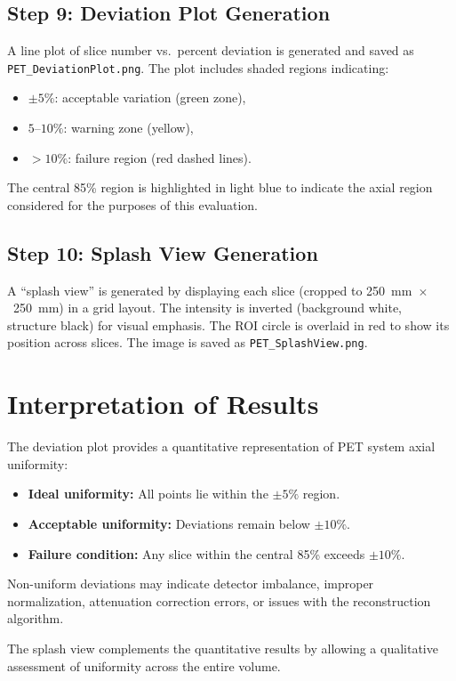 \documentclass[12pt]{article}
\begin{document}
\subsection{Step 9: Deviation Plot Generation}
A line plot of slice number vs.\ percent deviation is generated and saved as \texttt{PET\_DeviationPlot.png}. The plot includes shaded regions indicating:
\begin{itemize}
    \item $\pm5\%$: acceptable variation (green zone),
    \item $5\text{–}10\%$: warning zone (yellow),
    \item $>10\%$: failure region (red dashed lines).
\end{itemize}
The central 85\% region is highlighted in light blue to indicate the axial region considered for the purposes of this evaluation.

\subsection{Step 10: Splash View Generation}
A “splash view” is generated by displaying each slice (cropped to 250~mm~$\times$~250~mm) in a grid layout. The intensity is inverted (background white, structure black) for visual emphasis. The ROI circle is overlaid in red to show its position across slices. The image is saved as \texttt{PET\_SplashView.png}.

\section{Interpretation of Results}
The deviation plot provides a quantitative representation of PET system axial uniformity:
\begin{itemize}
    \item \textbf{Ideal uniformity:} All points lie within the $\pm5\%$ region.
    \item \textbf{Acceptable uniformity:} Deviations remain below $\pm10\%$.
    \item \textbf{Failure condition:} Any slice within the central 85\% exceeds $\pm10\%$.
\end{itemize}
Non-uniform deviations may indicate detector imbalance, improper normalization, attenuation correction errors, or issues with the reconstruction algorithm.

The splash view complements the quantitative results by allowing a qualitative assessment of uniformity across the entire volume.
\end{document}
